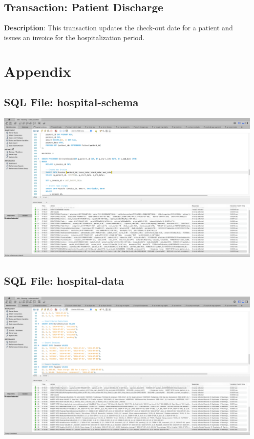 \documentclass[a4paper,11pt]{article}
\theoremstyle{mytheor}
\begin{document}
\subsection{Transaction: Patient Discharge}

\textbf{Description}: This transaction updates the check-out date for a patient and issues an invoice for the hospitalization period.

\appendix
\section{Appendix}

\subsection{SQL File: hospital-schema}
\includegraphics[width=\textwidth]{Screenshots/SCR-20240727-pdth.png}

\subsection{SQL File: hospital-data}
\includegraphics[width=\textwidth]{Screenshots/SCR-20240727-peev.png}
\end{document}
